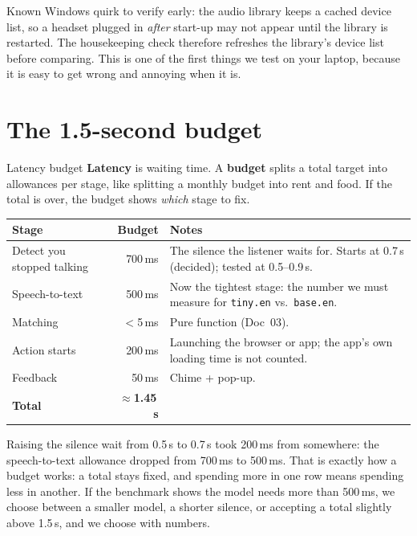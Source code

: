 \documentclass[11pt,a4paper]{article}
\begin{document}
\begin{caution}
Known Windows quirk to verify early: the audio library keeps a cached device list, so a
headset plugged in \emph{after} start-up may not appear until the library is restarted. The
housekeeping check therefore refreshes the library's device list before comparing. This is one
of the first things we test on your laptop, because it is easy to get wrong and annoying when
it is.
\end{caution}

\section{The 1.5-second budget}

\begin{concept}{Latency budget}
\textbf{Latency} is waiting time. A \textbf{budget} splits a total target into allowances per
stage, like splitting a monthly budget into rent and food. If the total is over, the budget
shows \emph{which} stage to fix.
\end{concept}

\begin{center}
\renewcommand{\arraystretch}{1.2}
\begin{tabularx}{\textwidth}{l r X}
\toprule
\textbf{Stage} & \textbf{Budget} & \textbf{Notes} \\
\midrule
Detect you stopped talking & 700\,ms & The silence the listener waits for. Starts at 0.7\,s (decided); tested at 0.5--0.9\,s. \\
Speech-to-text             & 500\,ms & Now the tightest stage: the number we must measure for \texttt{tiny.en} vs.\ \texttt{base.en}. \\
Matching                   & $<$5\,ms & Pure function (Doc~03). \\
Action starts              & 200\,ms & Launching the browser or app; the app's own loading time is not counted. \\
Feedback                   & 50\,ms  & Chime + pop-up. \\
\midrule
\textbf{Total}             & \textbf{$\approx$1.45\,s} & \\
\bottomrule
\end{tabularx}
\end{center}

\noindent Raising the silence wait from 0.5\,s to 0.7\,s took 200\,ms from somewhere: the
speech-to-text allowance dropped from 700\,ms to 500\,ms. That is exactly how a budget works:
a total stays fixed, and spending more in one row means spending less in another. If the
benchmark shows the model needs more than 500\,ms, we choose between a smaller model, a shorter
silence, or accepting a total slightly above 1.5\,s, and we choose with numbers.
\end{document}

